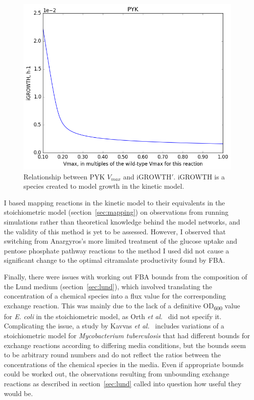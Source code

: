 \documentclass[parskip=full, numbers=noenddot]{scrreprt}
\begin{document}
\begin{figure}[htbp]
  \centering
  \includegraphics[scale=0.5]{issues_igrowth}
  \caption{Relationship between PYK $V_{max}$ and $\mathrm{iGROWTH}'$. iGROWTH is a species created to model growth in the kinetic model.}
  \label{fig:issues_igrowth}
\end{figure}

I based mapping reactions in the kinetic model to their equivalents in the stoichiometric model (section~\ref{sec:mapping}) on observations from running simulations rather than theoretical knowledge behind the model networks, and the validity of this method is yet to be assessed. However, I observed that switching from Anargyros's more limited treatment of the glucose uptake and pentose phosphate pathway reactions to the method I used did not cause a significant change to the optimal citramalate productivity found by FBA.

Finally, there were issues with working out FBA bounds from the composition of the Lund medium (section~\ref{sec:lund}), which involved translating the concentration of a chemical species into a flux value for the corresponding exchange reaction. This was mainly due to the lack of a definitive OD\textsubscript{600} value for \emph{E. coli} in the stoichiometric model, as Orth \emph{et al.}~\cite{orth_comprehensive_2011} did not specify it. Complicating the issue, a study by Kavvas \emph{et al.}~\cite{kavvas_updated_2018} includes variations of a stoichiometric model for \emph{Mycobacterium tuberculosis} that had different bounds for exchange reactions according to differing media conditions, but the bounds seem to be arbitrary round numbers and do not reflect the ratios between the concentrations of the chemical species in the media. Even if appropriate bounds could be worked out, the observations resulting from unbounding exchange reactions as described in section~\ref{sec:lund} called into question how useful they would be.
\end{document}
